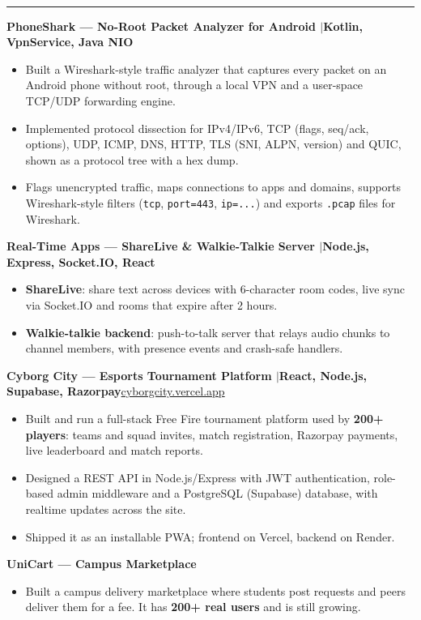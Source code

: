 \documentclass[10pt,a4paper]{article}
\renewcommand{\section}[1]{\vspace{6pt}{\large\bfseries\MakeUppercase{#1}}\\[-7pt]\rule{\textwidth}{0.6pt}\vspace{2pt}}
\newcommand{\entry}[2]{\par\textbf{#1}\hfill #2\par}
\newenvironment{points}{\vspace{-4pt}\begin{itemize}\setlength{\itemsep}{0pt}\setlength{\parskip}{0pt}\setlength{\topsep}{0pt}\setlength{\partopsep}{0pt}\setlength{\leftmargin}{12pt}}{\end{itemize}\vspace{-2pt}}
\newcommand{\sep}{\enspace$|$\enspace}
\begin{document}
\section{Projects}
\entry{PhoneShark --- No-Root Packet Analyzer for Android \textnormal{\sep Kotlin, VpnService, Java NIO}}{}
\begin{points}
  \item Built a Wireshark-style traffic analyzer that captures every packet on an Android phone without root, through a local VPN and a user-space TCP/UDP forwarding engine.
  \item Implemented protocol dissection for IPv4/IPv6, TCP (flags, seq/ack, options), UDP, ICMP, DNS, HTTP, TLS (SNI, ALPN, version) and QUIC, shown as a protocol tree with a hex dump.
  \item Flags unencrypted traffic, maps connections to apps and domains, supports Wireshark-style filters (\texttt{tcp}, \texttt{port=443}, \texttt{ip=...}) and exports \texttt{.pcap} files for Wireshark.
\end{points}
\entry{Real-Time Apps --- ShareLive \& Walkie-Talkie Server \textnormal{\sep Node.js, Express, Socket.IO, React}}{}
\begin{points}
  \item \textbf{ShareLive}: share text across devices with 6-character room codes, live sync via Socket.IO and rooms that expire after 2 hours.
  \item \textbf{Walkie-talkie backend}: push-to-talk server that relays audio chunks to channel members, with presence events and crash-safe handlers.
\end{points}
\entry{Cyborg City --- Esports Tournament Platform \textnormal{\sep React, Node.js, Supabase, Razorpay}}{\href{https://cyborgcity.vercel.app}{cyborgcity.vercel.app}}
\begin{points}
  \item Built and run a full-stack Free Fire tournament platform used by \textbf{200+ players}: teams and squad invites, match registration, Razorpay payments, live leaderboard and match reports.
  \item Designed a REST API in Node.js/Express with JWT authentication, role-based admin middleware and a PostgreSQL (Supabase) database, with realtime updates across the site.
  \item Shipped it as an installable PWA; frontend on Vercel, backend on Render.
\end{points}
\entry{UniCart --- Campus Marketplace}{}
\begin{points}
  \item Built a campus delivery marketplace where students post requests and peers deliver them for a fee. It has \textbf{200+ real users} and is still growing.
\end{points}
\end{document}
